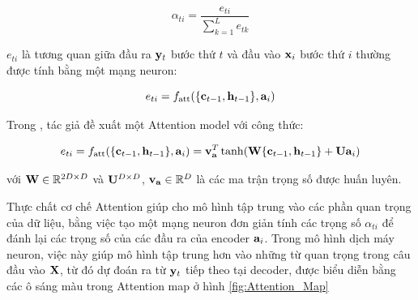 \documentclass[14pt, a4paper]{article}
\numberwithin{equation}{section}
\numberwithin{algorithm}{section}
\numberwithin{figure}{section}
\numberwithin{table}{section}
\numberwithin{dl}{section}
\numberwithin{md}{section}
\numberwithin{bd}{section}
\numberwithin{dn}{section}
\numberwithin{hq}{section}
\begin{document}
    \begin{equation}
        \alpha_{ti} = \dfrac{e_{ti}}{\sum_{k=1}^{L} e_{tk}}
    \end{equation}

    $e_{ti}$ là tương quan giữa đầu ra $\bold{y}_t$ bước thứ $t$ và đầu vào $\bold{x}_i$ bước thứ $i$ thường được tính bằng một mạng neuron:

    \begin{equation}
        e_{ti} = f_{\text{att}}(\lbrace \bold{c}_{t-1}, \bold{h}_{t-1} \rbrace, \bold{a}_i)
    \end{equation}

    Trong \cite{bahdanau2014neural}, tác giả đề xuất một Attention model với công thức:

    \begin{equation}
        e_{ti} = f_{\text{att}}(\lbrace \bold{c}_{t-1}, \bold{h}_{t-1} \rbrace, \bold{a}_i) = \bold{v}_{\bold{a}}^T \tanh (\bold{W} \lbrace \bold{c}_{t-1}, \bold{h}_{t-1} \rbrace + \bold{U}\bold{a}_i)
    \end{equation}

    với $\bold{W} \in \mathbb{R}^{2D \times D}$ và $\bold{U}^{D \times D}$, $\bold{v}_{\bold{a}} \in \mathbb{R}^{D}$ là các ma trận trọng số được huấn luyên.

    Thực chất cơ chế Attention giúp cho mô hình tập trung vào các phần quan trọng của dữ liệu, bằng việc tạo một mạng neuron đơn giản tính các trọng số $\alpha_{ti}$ để đánh lại các trọng số của các đầu ra của encoder $\bold{a}_i$.
    Trong mô hình dịch máy neuron, việc này giúp mô hình tập trung hơn vào những từ quan trọng trong câu đầu vào $\bold{X}$, từ đó dự đoán ra từ $\bold{y}_t$ tiếp theo tại decoder, được biểu diễn bằng các ô sáng màu trong Attention map ở hình \ref{fig:Attention_Map}
\end{document}
